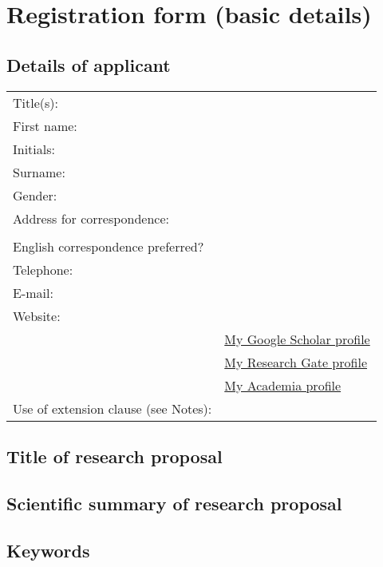 \section{Registration form (basic details)}

\subsection{Details of applicant}\label{sec:mydetails}

\begin{tabular}{ll}
Title(s): &  \\
First name: &  \\
Initials: & \\
Surname: &  \\
Gender: &  \\
Address for correspondence:& \\
&\\
English correspondence preferred? & \\
Telephone: & \\
E-mail: & \href{mailto:}{} \\
Website: & \href{}{}\\
&\href{}{My Google
Scholar profile}\\
& \href{}{My Research
Gate profile}\\
& \href{}{My Academia profile}\\
Use of extension clause (see Notes): &  \\
\end{tabular}
 

\subsection{Title of research proposal}\label{sec:title}


\subsection{Scientific summary of research proposal
}\label{sec:summary}

\subsection{Keywords }\label{sec:keywords}

